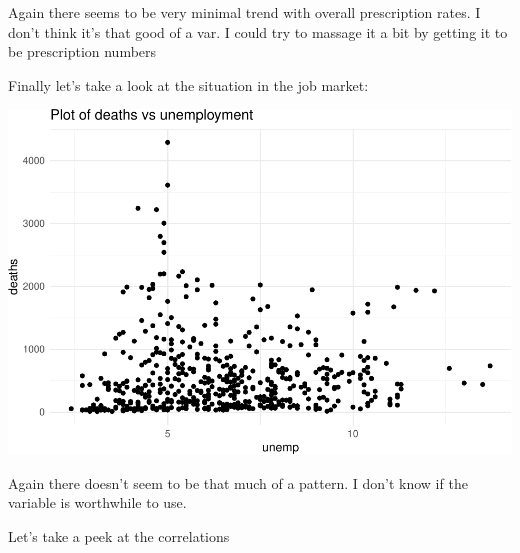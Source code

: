 \documentclass[]{article}
\newenvironment{Shaded}{\begin{snugshade}}{\end{snugshade}}
\newcommand{\DataTypeTok}[1]{\textcolor[rgb]{0.13,0.29,0.53}{#1}}
\newcommand{\KeywordTok}[1]{\textcolor[rgb]{0.13,0.29,0.53}{\textbf{#1}}}
\newcommand{\NormalTok}[1]{#1}
\newcommand{\OperatorTok}[1]{\textcolor[rgb]{0.81,0.36,0.00}{\textbf{#1}}}
\newcommand{\StringTok}[1]{\textcolor[rgb]{0.31,0.60,0.02}{#1}}
\begin{document}
Again there seems to be very minimal trend with overall prescription
rates. I don't think it's that good of a var. I could try to massage it
a bit by getting it to be prescription numbers

Finally let's take a look at the situation in the job market:

\begin{Shaded}
\end{Shaded}

\includegraphics{Assignment_1_files/figure-latex/plots8-1.pdf}

Again there doesn't seem to be that much of a pattern. I don't know if
the variable is worthwhile to use.

Let's take a peek at the correlations

\begin{Shaded}
\end{Shaded}
\end{document}

